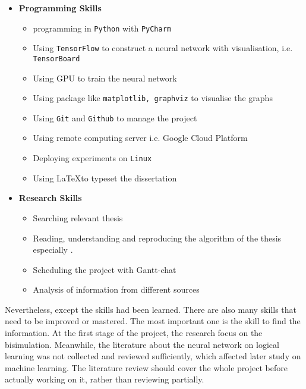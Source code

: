 \begin{itemize}
    \item \textbf{Programming Skills}
    \begin{itemize}
        \item programming in \texttt{Python} with \texttt{PyCharm}
        \item Using \texttt{TensorFlow} to construct a neural network with visualisation, i.e. \texttt{TensorBoard}
        \item Using GPU to train the neural network
        \item Using package like \texttt{matplotlib, graphviz} to visualise the graphs
        \item Using \texttt{Git} and \texttt{Github} to manage the project
        \item Using remote computing server i.e. Google Cloud Platform
        \item Deploying experiments on \texttt{Linux}
        \item Using \LaTeX to typeset the dissertation
    \end{itemize}
    \item \textbf{Research Skills}
    \begin{itemize}
        \item Searching relevant thesis
        \item Reading, understanding and reproducing the algorithm of the thesis especially \cite{Paige1987}.
        \item Scheduling the project with Gantt-chat
        \item Analysis of information from different sources
    \end{itemize}
\end{itemize}
Nevertheless, except the skills had been learned.
There are also many skills that need to be improved or mastered.
The most important one is the skill to find the information.
At the first stage of the project, the research focus on the bisimulation. 
Meanwhile, the literature about the neural network on logical learning was not collected and reviewed sufficiently, which affected later study on machine learning.
The literature review should cover the whole project before actually working on it, rather than reviewing partially.


